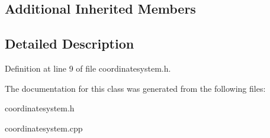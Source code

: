 \subsection*{Additional Inherited Members}


\subsection{Detailed Description}


Definition at line 9 of file coordinatesystem.\-h.



The documentation for this class was generated from the following files\-:\begin{DoxyCompactItemize}
\item 
coordinatesystem.\-h\item 
coordinatesystem.\-cpp\end{DoxyCompactItemize}
